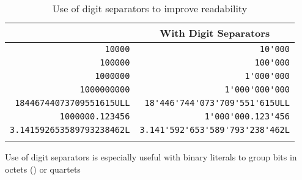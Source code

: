 \begin{table}[h!]
\begin{center}
\begin{threeparttable}
\caption{Use of digit separators to improve readability}\label{digitseparator-table1}\vspace{1.5ex}
{\small \begin{tabular}{c|c}\thickhline
\rowcolor[gray]{.9}{\sffamily\bfseries Without Digit Separator} & {\sffamily\bfseries With Digit Separators} \\ \hline
\multicolumn{1}{r|}{\lstinline!10000!} & \multicolumn{1}{r}{\lstinline!10'000!} \\ \hline
\multicolumn{1}{r|}{\lstinline!100000!} & \multicolumn{1}{r}{\lstinline!100'000!} \\ \hline
\multicolumn{1}{r|}{\lstinline!1000000!} & \multicolumn{1}{r}{\lstinline!1'000'000!} \\ \hline
\multicolumn{1}{r|}{\lstinline!1000000000!} & \multicolumn{1}{r}{\lstinline!1'000'000'000!} \\ \hline
\multicolumn{1}{r|}{\lstinline!18446744073709551615ULL!} & \multicolumn{1}{r}{\lstinline!18'446'744'073'709'551'615ULL!} \\ \hline
\multicolumn{1}{r|}{\lstinline!1000000.123456!} & \multicolumn{1}{r}{\lstinline!1'000'000.123'456!} \\ \hline
\multicolumn{1}{r|}{\lstinline!3.141592653589793238462L!} & \multicolumn{1}{r}{\lstinline!3.141'592'653'589'793'238'462L!} \\ \thickhline
\end{tabular}
} %
\end{threeparttable}
\end{center}
\end{table}
\noindent Use of digit separators is especially useful with binary
literals to group bits in octets () or quartets
